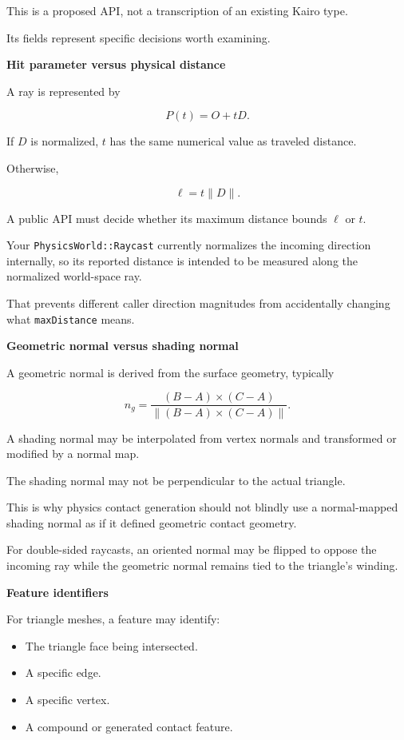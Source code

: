 This is a proposed API, not a transcription of an existing Kairo type.

Its fields represent specific decisions worth examining.

\textbf{Hit parameter versus physical distance}

A ray is represented by

\[
P(t)=O+tD.
\]

If \(D\) is normalized, \(t\) has the same numerical value as traveled distance.

Otherwise,

\[
\ell=t\|D\|.
\]

A public API must decide whether its maximum distance bounds \(\ell\) or \(t\).

Your \texttt{PhysicsWorld::Raycast} currently normalizes the incoming direction internally, so its reported distance is intended to be measured along the normalized world-space ray.

That prevents different caller direction magnitudes from accidentally changing what \texttt{maxDistance} means.

\textbf{Geometric normal versus shading normal}

A geometric normal is derived from the surface geometry, typically

\[
n_g=\frac{(B-A)\times(C-A)} {\|(B-A)\times(C-A)\|}.
\]

A shading normal may be interpolated from vertex normals and transformed or modified by a normal map.

The shading normal may not be perpendicular to the actual triangle.

This is why physics contact generation should not blindly use a normal-mapped shading normal as if it defined geometric contact geometry.

For double-sided raycasts, an oriented normal may be flipped to oppose the incoming ray while the geometric normal remains tied to the triangle's winding.

\textbf{Feature identifiers}

For triangle meshes, a feature may identify:

\begin{itemize}
\tightlist
\item
  The triangle face being intersected.
\item
  A specific edge.
\item
  A specific vertex.
\item
  A compound or generated contact feature.
\end{itemize}

